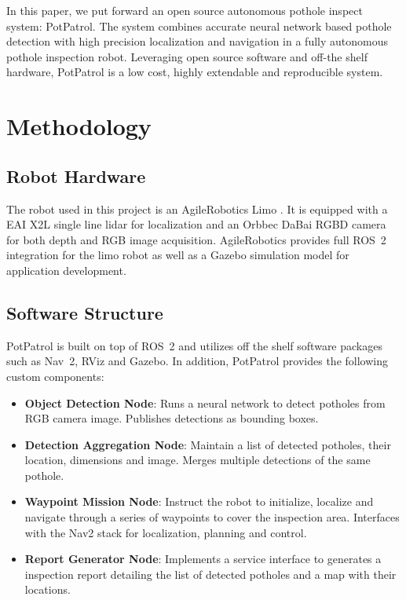 \documentclass[conference]{IEEEtran}
\begin{document}
In this paper, we put forward an open source autonomous pothole inspect system: PotPatrol. The system combines accurate neural network based pothole detection with high precision localization and navigation in a fully autonomous pothole inspection robot. Leveraging open source software and off-the shelf hardware, PotPatrol is a low cost, highly extendable and reproducible system.

\section{Methodology}

\subsection{Robot Hardware}

The robot used in this project is an AgileRobotics Limo \cite{AgilexAi}. It is equipped with a EAI X2L single line lidar \cite{YDLIDARX2_YDLIDARFocus} for localization and an Orbbec DaBai \cite{HomeORBBEC3D} RGBD camera for both depth and RGB image acquisition. AgileRobotics provides full ROS~2 integration for the limo robot as well as a Gazebo simulation model for application development.

\subsection{Software Structure}

PotPatrol is built on top of ROS~2 and utilizes off the shelf software packages such as Nav~2, RViz and Gazebo. In addition, PotPatrol provides the following custom components:

\begin{itemize}
    \item \textbf{Object Detection Node}: Runs a neural network to detect potholes from RGB camera image. Publishes detections as bounding boxes.
    \item \textbf{Detection Aggregation Node}: Maintain a list of detected potholes, their location, dimensions and image. Merges multiple detections of the same pothole.
    \item \textbf{Waypoint Mission Node}: Instruct the robot to initialize, localize and navigate through a series of waypoints to cover the inspection area. Interfaces with the Nav2 stack for localization, planning and control.
    \item \textbf{Report Generator Node}: Implements a service interface to generates a inspection report detailing the list of detected potholes and a map with their locations.
\end{itemize}
\end{document}
